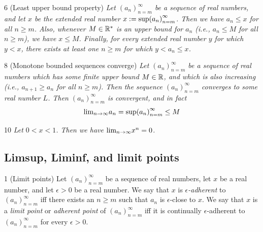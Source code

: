 \begin{proposition}{6}
    \label{sequence-lub-property}
    (Least upper bound property) \emph{Let $(a_n)_{n=m}^{\infty}$ be a sequence
    of real numbers, and let $x$ be the extended real number $x := \text{sup}{(a_n)}_{n=m}^{\infty}$.
    Then we have $a_n \leq x$ for all $n \geq m$. Also, whenever $M \in \mathbb{R}^*$
    is an upper bound for $a_n$ (i.e., $a_n \leq M$ for all $n \geq m$), we have
    $x \leq M$. Finally, for every extended real number $y$ for which $y < x$,
    there exists at least one $n \geq m$ for which $y < a_n \leq x$.}
\end{proposition}

\begin{proposition}{8}
    \label{monotone-bounded-converge}
    (Monotone bounded sequences converge) \emph{Let $(a_n)_{n=m}^{\infty}$ be a
    sequence of real numbers which has some finite upper bound $M \in \mathbb{R}$,
    and which is also increasing (i.e., $a_{n+1} \geq a_n$ for all $n \geq m$).
    Then the sequence $(a_n)_{n=m}^{\infty}$ converges to some real number $L$.
    Then $(a_n)_{n=m}^{\infty}$ is convergent, and in fact
    \begin{equation*}
        \text{lim}_{n \rightarrow \infty}{a_n} = \text{sup}{(a_n)}_{n=m}^{\infty} \leq M
    \end{equation*}
    }
\end{proposition}

\begin{proposition}{10}
    \label{lim-geometric-zero}
    \emph{Let $0 < x < 1$. Then we have $\text{lim}_{n \rightarrow \infty}{x^n = 0}$.}
\end{proposition}

\subsection{Limsup, Liminf, and limit points}
\begin{definition}{1}
    \label{limit-point}
    (Limit points) Let $(a_n)_{n=m}^{\infty}$ be a sequence of real numbers, let
    $x$ be a real number, and let $\epsilon > 0$ be a real number. We say that $x$
    is \emph{$\epsilon$-adherent} to $(a_n)_{n=m}^{\infty}$ iff there exists an
    $n \geq m$ such that $a_n$ is $\epsilon$-close to $x$. We say that $x$ is a
    \emph{limit point} or \emph{adherent point} of $(a_n)_{n=m}^{\infty}$ iff it
    is continually $\epsilon$-adherent to $(a_n)_{n=m}^{\infty}$ for every $\epsilon > 0$.
\end{definition}

